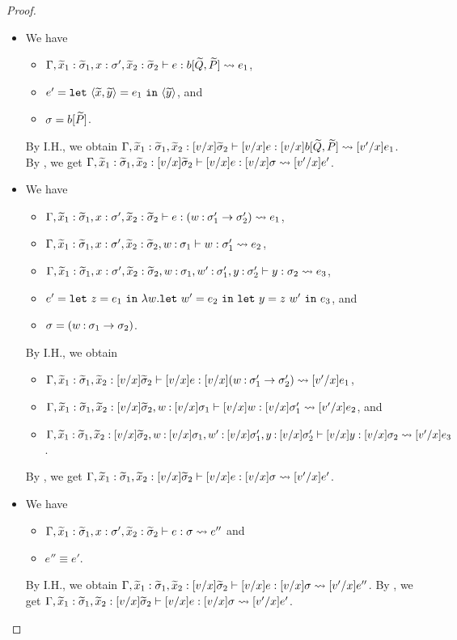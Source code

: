\begin{proof}
\begin{itemize}
\item[] 
We have
\begin{itemize}
\item \(\Gamma,\widetilde{x}_1:\widetilde{\sigma}_1,x:\sigma',\widetilde{x}_2:\widetilde{\sigma}_2 \vdash e : b[\widetilde{Q},\widetilde{P}] \leadsto e_1\),
\item \(e'=\mathtt{let~}\langle{\widetilde{x},\widetilde{y}}\rangle=e_1\mathtt{~in~}{\langle{\widetilde{y}}\rangle}\), and
\item \(\sigma=b[\widetilde{P}]\).
\end{itemize}
By I.H., we obtain
\(\Gamma,\widetilde{x}_1:\widetilde{\sigma}_1,\widetilde{x}_2:[v/x]\widetilde{\sigma}_2 \vdash [v/x]e : [v/x]b[\widetilde{Q},\widetilde{P}] \leadsto [v'/x]e_1\).
By , we get
\(\Gamma,\widetilde{x}_1:\widetilde{\sigma}_1,\widetilde{x}_2:[v/x]\widetilde{\sigma}_2 \vdash [v/x]e : [v/x]\sigma \leadsto [v'/x]e'\).

\item[] 
We have
\begin{itemize}
\item \(\Gamma,\widetilde{x}_1:\widetilde{\sigma}_1,x:\sigma',\widetilde{x}_2:\widetilde{\sigma}_2 \vdash e : (w\mathbin{:}\sigma'_1\to\sigma'_2) \leadsto e_1\),
\item \(\Gamma,\widetilde{x}_1:\widetilde{\sigma}_1,x:\sigma',\widetilde{x}_2:\widetilde{\sigma}_2,w\mathbin{:}\sigma_1 \vdash w : \sigma'_1 \leadsto e_2\),
\item \(\Gamma,\widetilde{x}_1:\widetilde{\sigma}_1,x:\sigma',\widetilde{x}_2:\widetilde{\sigma}_2,w\mathbin{:}\sigma_1,w'\mathbin{:}\sigma'_1,y\mathbin{:}\sigma'_2 \vdash y : \sigma_2 \leadsto e_3\),
\item \(e'=\mathtt{let~}z=e_1\mathtt{~in~}\lambda w.\mathtt{let~}w'=e_2\mathtt{~in~}\mathtt{let~}y=z\ w'\mathtt{~in~}e_3\), and
\item \(\sigma=(w\mathbin{:}\sigma_1\to\sigma_2)\).
\end{itemize}
By I.H., we obtain
\begin{itemize}
\item \(\Gamma,\widetilde{x}_1:\widetilde{\sigma}_1,\widetilde{x}_2:[v/x]\widetilde{\sigma}_2 \vdash [v/x]e : [v/x](w\mathbin{:}\sigma'_1\to\sigma'_2) \leadsto [v'/x]e_1\),
\item \(\Gamma,\widetilde{x}_1:\widetilde{\sigma}_1,\widetilde{x}_2:[v/x]\widetilde{\sigma}_2,w\mathbin{:}[v/x]\sigma_1 \vdash [v/x]w : [v/x]\sigma'_1 \leadsto [v'/x]e_2\), and
\item \(\Gamma,\widetilde{x}_1:\widetilde{\sigma}_1,\widetilde{x}_2:[v/x]\widetilde{\sigma}_2,w\mathbin{:}[v/x]\sigma_1,w'\mathbin{:}[v/x]\sigma'_1,y\mathbin{:}[v/x]\sigma'_2 \vdash [v/x]y : [v/x]\sigma_2 \leadsto [v'/x]e_3\).
\end{itemize}
By , we get
\(\Gamma,\widetilde{x}_1:\widetilde{\sigma}_1,\widetilde{x}_2:[v/x]\widetilde{\sigma}_2 \vdash [v/x]e : [v/x]\sigma \leadsto [v'/x]e'\).

\item[] 
We have
\begin{itemize}
\item \(\Gamma,\widetilde{x}_1:\widetilde{\sigma}_1,x:\sigma',\widetilde{x}_2:\widetilde{\sigma}_2 \vdash e : \sigma \leadsto e''\) and
\item \(e'' \equiv e'\).
\end{itemize}
By I.H., we obtain
\(\Gamma,\widetilde{x}_1:\widetilde{\sigma}_1,\widetilde{x}_2:[v/x]\widetilde{\sigma}_2 \vdash [v/x]e : [v/x]\sigma \leadsto [v'/x]e''\).
By , we get
\(\Gamma,\widetilde{x}_1:\widetilde{\sigma}_1,\widetilde{x}_2:[v/x]\widetilde{\sigma}_2 \vdash [v/x]e : [v/x]\sigma \leadsto [v'/x]e'\).
\end{itemize}
\end{proof}

